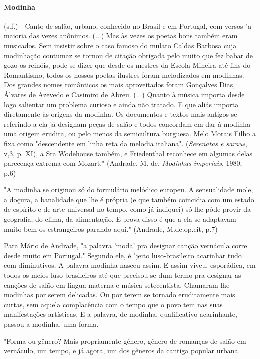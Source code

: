 \paragraph{Modinha} (s.f.) - Canto de salão, urbano, conhecido no Brasil e
em Portugal, com versos "a maioria das vezes anônimos. (...) Mas às
vezes os poetas bons também eram musicados. Sem insistir sobre o caso
famoso do mulato Caldas Barbosa cuja modinhação contumaz se tornou de
citação obrigada pelo muito que fez babar de gozo os reinóis, pode-se
dizer que desde os mestres da Escola Mineira até fins do Romantismo,
todos os nossos poetas ilustres foram melodizados em modinhas. Dos
grandes nomes românticos os mais aproveitados foram Gonçalves Dias,
Álvares de Azevedo e Casimiro de Abreu. (...) Quanto à música importa
desde logo salientar um problema curioso e ainda não tratado. E que
aliás importa diretamente às origens da modinha. Os documentos e textos
mais antigos se referindo a ela já designam peças de salão e todos
concordam em dar à modinha uma origem erudita, ou pelo menos da
semicultura burguesa. Melo Morais Filho a fixa como "descendente em
linha reta da melodia italiana". (\emph{Serenatas e saraus}, v,3, p.
XI), a Sra Wodehouse também, e Friedenthal reconhece em algumas delas
parecença extrema com Mozart." (Andrade, M. de. \emph{Modinhas
imperiais}, 1980, p.6)

"A modinha se originou só do formulário melódico europeu. A sensualidade
mole, a doçura, a banalidade que lhe é própria (e que também coincidia
com um estado de espírito e de arte universal no tempo, como já
indiquei) só lhe pôde provir da geografia, do clima, da alimentação. E
prova disso é que a ela se adaptavam muito bem os estrangeiros parando
aqui." (Andrade, M.de.op.eit, p.7)

Para Mário de Andrade, "a palavra 'moda' pra designar canção vernácula
corre desde muito em Portugal." Segundo ele, é "jeito luso-brasileiro
acarinhar tudo com diminutivos. A palavra modinha nasceu assim. E assim
viveu, esporádica, em todos os meios luso-brasileiros até que
precisou-se dum termo pra designar as canções de salão em língua materna
e música setecentista. Chamaram-lhe modinhas por serem delicadas. Ou por
terem se tornado eruditamente mais curtas, sem aquela complacência com o
tempo que o povo tem nas suas manifestações artísticas. E a palavra, de
modinha, qualificativo acarinhante, passou a modinha, uma forma.

"Forma ou gênero? Mais propriamente gênero, gênero de romanças de salão
em vernáculo, um tempo, e já agora, um dos gêneros da cantiga popular
urbana.

